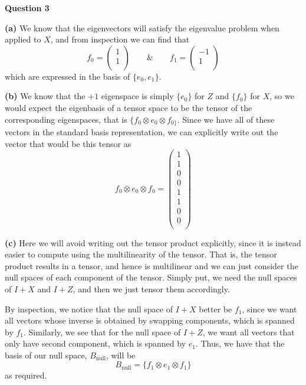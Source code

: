 \documentclass[10pt]{article}
\begin{document}
\newpage
\textbf{Question 3}

\textbf{(a)} We know that the eigenvectors will satisfy the eigenvalue problem when applied to $X$, and from inspection we can find that
\[ f_{0} =
\begin{pmatrix}
  1 \\
  1 \\
\end{pmatrix}
\hspace{2em} \& \hspace{2em} f_{1} =
\begin{pmatrix}
  -1 \\
  1 \\
\end{pmatrix}
\]
which are expressed in the basis of $\{e_{0},e_{1}\}$.

\textbf{(b)} We know that the $+1$ eigenspace is simply $\{e_{0}\}$ for $Z$ and $\{f_{0}\}$ for $X$, so we would expect the eigenbasis of a tensor space to be the tensor of the corresponding eigenspaces, that is $\{f_{0} \otimes e_{0} \otimes f_{0\}}$. Since we have all of these vectors in the standard basis representation, we can explicitly write out the vector that would be this tensor as
\[ f_{0} \otimes e_{0} \otimes f_{0} =
\begin{pmatrix}
  1 \\
  1 \\
  0 \\
  0 \\
  1 \\
  1 \\
  0 \\
  0 \\
\end{pmatrix}
\]

\textbf{(c)} Here we will avoid writing out the tensor product explicitly, since it is instead easier to compute using the multilinearity of the tensor. That is, the tensor product results in a tensor, and hence is multilinear and we can just consider the null spaces of each component of the tensor. Simply put, we need the null spaces of $I+X$ and $I+Z$, and then we just tensor them accordingly.

By inspection, we notice that the null space of $I+X$ better be $f_{1}$, since we want all vectors whose inverse is obtained by swapping components, which is spanned by $f_{1}$. Similarly, we see that for the null space of $I+Z$, we want all vectors that only have second component, which is spanned by $e_{1}$. Thus, we have that the basis of our null space, $B_{\text{null}}$, will be
\[ B_{\text{null}} = \{f_{1} \otimes e_{1} \otimes f_{1} \} \]
as required.
\end{document}
